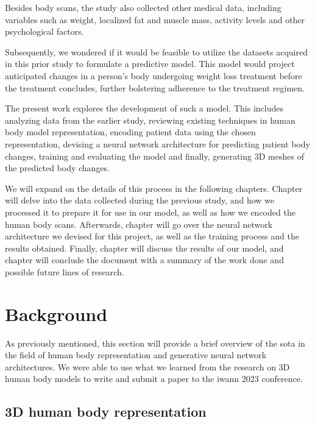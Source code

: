 Besides body scans, the study also collected other medical data, including
variables such as weight, localized fat and muscle mass, activity levels and
other psychological factors.

Subsequently, we wondered if it would be feasible to utilize the datasets
acquired in this prior study to formulate a predictive model. This model would
project anticipated changes in a person's body undergoing weight loss treatment
before the treatment concludes, further bolstering adherence to the treatment
regimen.

The present work explores the development of such a model. This includes
analyzing data from the earlier study, reviewing existing techniques in human
body model representation, encoding patient data using the chosen
representation, devising a neural network architecture for predicting patient
body changes, training and evaluating the model and finally, generating 3D
meshes of the predicted body changes.

We will expand on the details of this process in the following chapters.
Chapter  will delve into the data collected during the previous
study, and how we processed it to prepare it for use in our model, as well as
how we encoded the human body scans. Afterwards, chapter  will go
over the neural network architecture we devised for this project, as well as
the training process and the results obtained. Finally, chapter
 will discuss the results of our model, and chapter
 will conclude the document with a summary of the work done
and possible future lines of research.

\section{Background}

As previously mentioned, this section will provide a brief overview of the
\gls{sota} in the field of human body representation and generative neural
network architectures. We were able to use what we learned from the research on
3D human body models to write and submit a paper to the \gls{iwann} 2023
conference. 

\subsection{3D human body representation}

